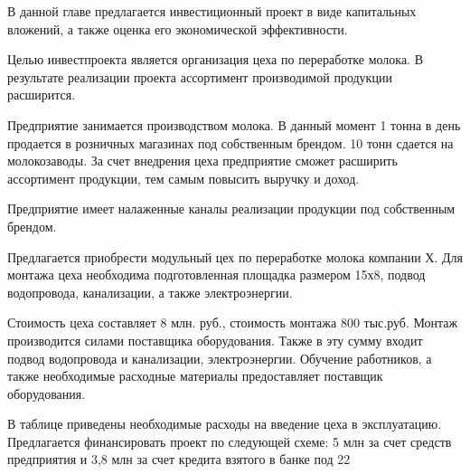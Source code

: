В данной главе предлагается инвестиционный проект в виде капитальных вложений, а также оценка его экономической эффективности.

Целью инвестпроекта является организация цеха по переработке молока. В результате реализации проекта ассортимент производимой продукции расширится. 

Предприятие занимается производством молока. В данный момент 1 тонна в день продается в розничных магазинах под собственным брендом. 10 тонн сдается на молокозаводы. За счет внедрения цеха предприятие сможет расширить ассортимент продукции, тем самым повысить выручку и доход. 

Предприятие имеет налаженные каналы реализации продукции под собственным брендом. 


Предлагается приобрести модульный цех по переработке молока компании Х. Для монтажа цеха необходима подготовленная площадка размером 15х8, подвод водопровода, канализации, а также электроэнергии.

Стоимость цеха составляет 8 млн. руб., стоимость монтажа 800 тыс.руб. Монтаж производится силами поставщика оборудования. Также в эту сумму входит подвод водопровода и канализации, электроэнергии. Обучение работников, а также необходимые расходные материалы предоставляет поставщик оборудования.

В таблице приведены необходимые расходы на введение цеха в эксплуатацию.
Предлагается финансировать проект по следующей схеме: 5 млн за счет средств предприятия и 3,8 млн за счет кредита взятого в банке под 22%


























